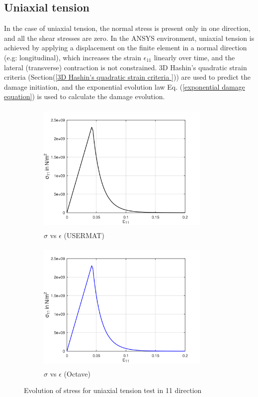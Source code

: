 \documentclass[12pt,a4paper,twoside,openright]{report}
\begin{document}
\subsection{Uniaxial tension}
\indent\indent\indent In the case of uniaxial tension, the normal stress is present only in one direction, and all the shear stresses are zero.  In the ANSYS environment, uniaxial tension is achieved by applying a displacement on the finite element in a normal direction (e.g: longitudinal), which increases the strain $\epsilon_{11}$ linearly over time, and the lateral (transverse) contraction is not constrained. 3D Hashin's quadratic strain criteria (Section(\ref{3D Hashin's quadratic strain criteria })) are used to predict the damage initiation, and the exponential evolution law Eq. (\ref{exponential damage equation}) is used to calculate the damage evolution. 
\begin{figure}[hbt!]
     \captionsetup[subfigure]{justification=centering}
      \centering
     \begin{subfigure}{0.4\textwidth}
        \includegraphics[width=8.3cm,height=6.35cm]{21.StressvsStrain_Ansys.png}
         \caption{$\sigma$ vs $\epsilon$ (USERMAT)}
         \label{fig:Stress-Strain relation in Ansys}
     \end{subfigure}
     \hspace{1.8cm}
     \begin{subfigure}{0.4\textwidth}
         \includegraphics[width=8.3cm,height=6.35cm]{21.StressvsStrain_Octave.png}
         \caption{$\sigma$ vs $\epsilon$ (Octave)}
         \label{fig:Stress-Strain relation Octave}
     \end{subfigure}
   \caption{Evolution of stress for uniaxial tension test in 11 direction}
   \label{fig:Evolution of stress  component for a uniaxial tension test in 11 direction} 
\end{figure}
\end{document}
